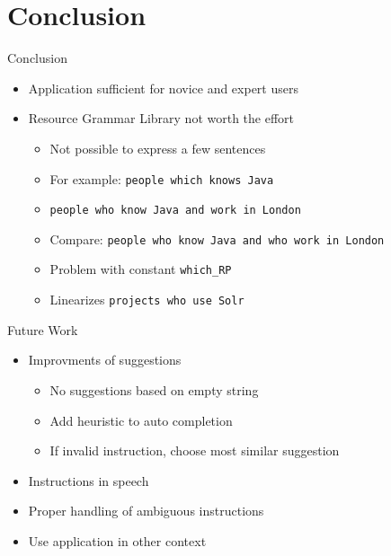 \section{Conclusion} 
\begin{frame}{Conclusion}\pause
\begin{itemize}
\item Application sufficient for novice and expert users \pause
\item Resource Grammar Library not worth the effort\pause
  \begin{itemize}
    \item Not possible to express a few sentences\pause
    \item For example: \texttt{people \textcolor{String}{which knows} Java}\pause
    \item \texttt{people \textcolor{String}{who} know Java and work in London} \pause
    \item Compare: \texttt{\footnotesize people \textcolor{String}{who} know Java and \textcolor{String}{who} work in London} \pause
    \item Problem with constant \texttt{which\_RP}\pause
    \item Linearizes \texttt{projects \textcolor{String}{who} use Solr}\pause  
  \end{itemize}
\end{itemize}
\end{frame}

\begin{frame}{Future Work}\pause
\begin{itemize}
\item Improvments of suggestions \pause
\begin{itemize}
  \item No suggestions based on empty string \pause
  \item Add heuristic to auto completion \pause
  \item If invalid instruction, choose most similar suggestion \pause
\end{itemize}
\item Instructions in speech \pause
\item Proper handling of ambiguous instructions \pause
\item Use application in other context
\end{itemize}
\end{frame}